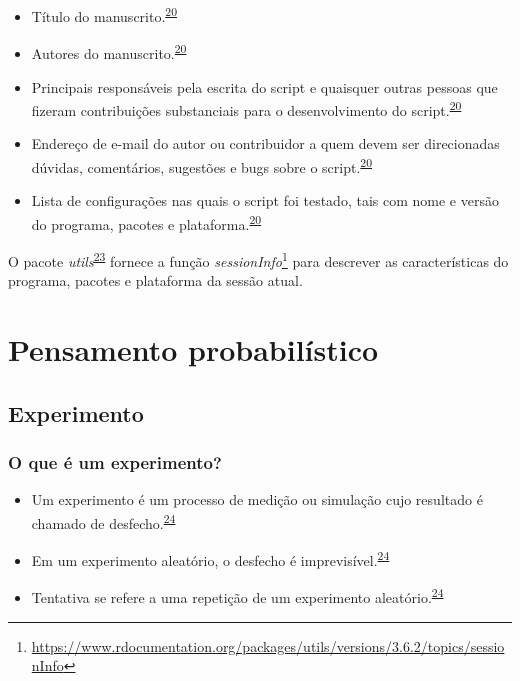 \documentclass[
  a4paper,
]{book}
\renewcommand{\href}[2]{#2\footnote{\url{#1}}}
\newenvironment{infobox}[1]
  {
  \begin{itemize}
  \renewcommand{\labelitemi}{
    \raisebox{-.7\height}[0pt][0pt]{
      {\setkeys{Gin}{width=3em,keepaspectratio}
        \texttt{[image: \#1]}}
    }
  }
  \setlength{\fboxsep}{1em}
  \begin{blackbox}
  \item
  }
  {
  \end{blackbox}
  \end{itemize}
  }
\begin{document}
\begin{itemize}
\item
  Título do manuscrito.\textsuperscript{\protect\hyperlink{ref-hofner2015}{20}}
\item
  Autores do manuscrito.\textsuperscript{\protect\hyperlink{ref-hofner2015}{20}}
\item
  Principais responsáveis pela escrita do script e quaisquer outras pessoas que fizeram contribuições substanciais para o desenvolvimento do script.\textsuperscript{\protect\hyperlink{ref-hofner2015}{20}}
\item
  Endereço de e-mail do autor ou contribuidor a quem devem ser direcionadas dúvidas, comentários, sugestões e bugs sobre o script.\textsuperscript{\protect\hyperlink{ref-hofner2015}{20}}
\item
  Lista de configurações nas quais o script foi testado, tais com nome e versão do programa, pacotes e plataforma.\textsuperscript{\protect\hyperlink{ref-hofner2015}{20}}
\end{itemize}

\begin{infobox}{images/Rlogo}
O pacote \emph{utils}\textsuperscript{\protect\hyperlink{ref-utils}{23}} fornece a função \href{https://www.rdocumentation.org/packages/utils/versions/3.6.2/topics/sessionInfo}{\emph{sessionInfo}} para descrever as características do programa, pacotes e plataforma da sessão atual.

\end{infobox}

\hypertarget{pensamento-probabilistico}{%
\chapter{\texorpdfstring{\textbf{Pensamento probabilístico}}{Pensamento probabilístico}}\label{pensamento-probabilistico}}

\hypertarget{experimento}{%
\section{Experimento}\label{experimento}}

\hypertarget{o-que-uxe9-um-experimento}{%
\subsection{O que é um experimento?}\label{o-que-uxe9-um-experimento}}

\begin{itemize}
\item
  Um experimento é um processo de medição ou simulação cujo resultado é chamado de desfecho.\textsuperscript{\protect\hyperlink{ref-grami2023}{24}}
\item
  Em um experimento aleatório, o desfecho é imprevisível.\textsuperscript{\protect\hyperlink{ref-grami2023}{24}}
\item
  Tentativa se refere a uma repetição de um experimento aleatório.\textsuperscript{\protect\hyperlink{ref-grami2023}{24}}
\end{itemize}
\end{document}
